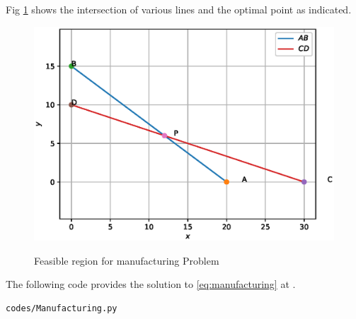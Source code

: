 \begin{enumerate}[label=\arabic*.,ref=\thesection.\theenumi]
Fig  \ref{fig:manufacturing}
shows the intersection of various lines and the optimal point as indicated.
\begin{figure}[h]
\includegraphics[width=\columnwidth]{./figs/lp_manufacturing.eps}
\caption{Feasible region for manufacturing Problem}
\caption{}
\label{fig:manufacturing}
\end{figure}

The following code provides the solution to \eqref{eq:manufacturing} at .
%
\begin{lstlisting}
codes/Manufacturing.py
\end{lstlisting}


\end{enumerate}
